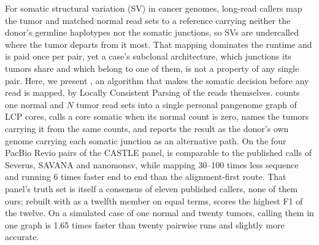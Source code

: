 For somatic structural variation (SV) in cancer genomes, long-read callers map the tumor and matched normal read sets to a reference carrying neither the donor's germline haplotypes nor the somatic junctions, so SVs are undercalled where the tumor departs from it most. That mapping dominates the runtime and is paid once per pair, yet a case's subclonal architecture, which junctions its tumors share and which belong to one of them, is not a property of any single pair. Here, we present \tool{}, an algorithm that makes the somatic decision before any read is mapped, by Locally Consistent Parsing of the reads themselves. \tool{} counts one normal and $N$ tumor read sets into a single personal pangenome graph of LCP cores, calls a core somatic when its normal count is zero, names the tumors carrying it from the same counts, and reports the result as the donor's own genome carrying each somatic junction as an alternative path. On the four PacBio Revio pairs of the CASTLE panel, \tool{} is comparable to the published calls of Severus, SAVANA and nanomonsv, while mapping 30--100 times less sequence and running 6 times faster end to end than the alignment-first route. That panel's truth set is itself a consensus of eleven published callers, none of them ours; rebuilt with \tool{} as a twelfth member on equal terms, \tool{} scores the highest F1 of the twelve. On a simulated case of one normal and twenty tumors, calling them in one graph is 1.65 times faster than twenty pairwise runs and slightly more accurate.